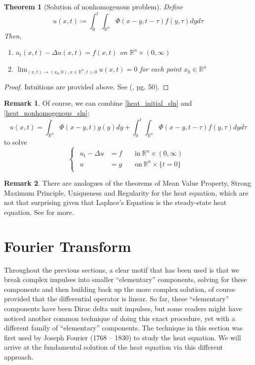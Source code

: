 \documentclass[openany, amssymb, psamsfonts]{amsart}
\newtheorem{thm}{Theorem}[section]
\theoremstyle{definition}
\newtheorem{rem}{Remark}[section]
\numberwithin{equation}{section}
\newcommand{\bbr}{\mathbb{R}}
\begin{document}
\begin{thm} [Solution of nonhomogenous problem] Define
\begin{equation} \label{heat_nonhomogenous_sln}
    u(x, t) \coloneqq \int_{0}^{t} \int_{\bbr^n} \Phi(x-y, t - \tau) f(y, \tau) dy d\tau
\end{equation}
Then,
\begin{enumerate}
    \item $u_t(x, t) - \Delta u(x, t) = f(x, t)$ on $\bbr^n \times (0, \infty)$
    \item $\lim_{(x, t) \to (x_0, 0), x \in \bbr^n, t >0} u(x, t) = 0$ for each point $x_0 \in \bbr^n$
\end{enumerate}
\end{thm}
\begin{proof}
    Intuitions are provided above. See (\cite{Evans}, pg. 50).
\end{proof}

\begin{rem}
Of course, we can combine \eqref{heat_initial_sln} and \eqref{heat_nonhomogenous_sln}:
\begin{equation}
u(x, t) = \int_{\bbr^n} \Phi(x- y, t) g(y) dy + \int_{0}^{t} \int_{\bbr^n} \Phi(x - y, t - \tau) f(y, \tau) dy d\tau
\end{equation}
to solve \begin{equation}
    \begin{cases}
    \begin{aligned}
        u_t - \Delta u &= f && \:\text{in}\: \bbr^n \times (0, \infty) \\
        u &= g && \:\text{on}\: \bbr^n \times \{t = 0\}
    \end{aligned}
    \end{cases}
\end{equation}
\end{rem}
\begin{rem}
There are analogues of the theorems of Mean Value Property, Strong Maximum Principle, Uniqueness and Regularity for the heat equation, which are not that surprising given that Laplace's Equation is the steady-state heat equation. See \cite{Evans} for more.
\end{rem}

\section{Fourier Transform}
Throughout the previous sections, a clear motif that has been used is that we break complex impulses into smaller ``elementary'' components, solving for these components and then building back up the more complex solution, of course provided that the differential operator is linear. So far, these ``elementary'' components have been Dirac delta unit impulses, but some readers might have noticed another common technique of doing this exact procedure, yet with a different family of ``elementary'' components. The technique in this section was first used by Joseph Fourier (1768 – 1830) to study the heat equation. We will arrive at the fundamental solution of the heat equation via this different approach.
\end{document}
